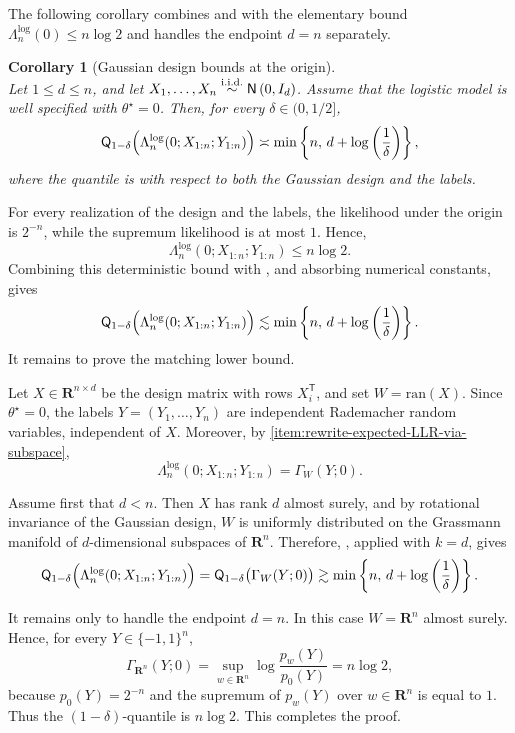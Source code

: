 \documentclass[11pt, letterpaper, hidelinks]{article}
\makeatletter
\renewcommand{\proofname}{\textit{\textbf{Proof}}}
\renewenvironment{proof}[1][\proofname]{\par\pushQED{\qed}\normalfont \topsep6\p@\@plus6\p@\relax\trivlist\item[\hskip\labelsep#1\@addpunct{}]\ignorespaces}{\popQED\endtrivlist\@endpefalse}
\newcommand{\R}{\mathbf R}
\newcommand{\1}{\mathbf 1}
\renewcommand{\le}{\leqslant}
\renewcommand{\leq}{\leqslant}
\newcommand{\T}{\mathsf{T}}
\newcommand{\iid}{\textnormal{i.i.d.}}
\newcommand{\simiid}{\stackrel{\iid}{\sim}}
\theoremstyle{plain}
\newtheorem{corollary}{Corollary}[section]
\theoremstyle{definition}
\newcommand{\thetastar}{\theta^\star}
\newcommand{\Normal}[2]{\mathsf{N}\left(#1, #2\right)}
\newcommand{\Quant}[1]{\mathsf{Q}_{#1}}
\newcommand{\ran}{\mathrm{ran}}
\makeatother
\begin{document}
The following corollary combines  and  with the elementary bound $\Lambda_n^{\operatorname{log}}(0)\leq n\log 2$ and handles the endpoint $d=n$ separately.

\begin{corollary}[Gaussian design bounds at the origin]
\label{cor:gaussian-design-origin}
\leavevmode\\
Let \(1\le d\le n\), and let \(X_1,\ldots,X_n\simiid \Normal{0}{I_d}\). Assume that the logistic model is well specified with \(\thetastar=0\). Then, for every \(\delta\in(0,1/2]\),
\[
\Quant{1-\delta} \Bigl( \Lambda_n^{\operatorname{log}}(0;X_{1:n};Y_{1:n}) \Bigr) \asymp \min\left\{ n,\, d+\log\left(\frac1\delta\right) \right\},
\]
where the quantile is with respect to both the Gaussian design and the labels.
\end{corollary}

\begin{proof}
For every realization of the design and the labels, the likelihood under the
origin is $2^{-n}$, while the supremum likelihood is at most $1$. Hence,
\[
\Lambda_n^{\operatorname{log}}(0;X_{1:n};Y_{1:n})\leq n\log 2.
\]
Combining this deterministic bound with
, and absorbing numerical constants, gives
\[
\Quant{1-\delta}
\Bigl(\Lambda_n^{\operatorname{log}}(0;X_{1:n};Y_{1:n})\Bigr)
\lesssim
\min\left\{n,\,d+\log\left(\frac1\delta\right)\right\}.
\]
It remains to prove the matching lower bound.

Let \(X\in\R^{n\times d}\) be the design matrix with rows \(X_i^\T\), and set
\(W=\ran(X)\). Since \(\thetastar=0\), the labels
\(Y=(Y_1,\ldots,Y_n)\) are independent Rademacher random variables, independent
of \(X\). Moreover, by
\ref{item:rewrite-expected-LLR-via-subspace},
\[
\Lambda_n^{\operatorname{log}}(0;X_{1:n};Y_{1:n})
=
\Gamma_W(Y;0).
\]

Assume first that \(d<n\). Then \(X\) has rank \(d\) almost surely, and by
rotational invariance of the Gaussian design, \(W\) is uniformly distributed on
the Grassmann manifold of \(d\)-dimensional subspaces of \(\R^n\). Therefore,
, applied with
\(k=d\), gives
\[
\Quant{1-\delta}
\Bigl(
\Lambda_n^{\operatorname{log}}(0;X_{1:n};Y_{1:n})
\Bigr)
=
\Quant{1-\delta}\bigl(\Gamma_W(Y;0)\bigr)
\gtrsim
\min\left\{
n,\,
d+\log\left(\frac1\delta\right)
\right\}.
\]

It remains only to handle the endpoint \(d=n\). In this case
\(W=\R^n\) almost surely. Hence, for every \(Y\in\{-1,1\}^n\),
\[
\Gamma_{\R^n}(Y;0)
=
\sup_{w\in\R^n}\log\frac{p_w(Y)}{p_0(Y)}
=
n\log 2,
\]
because \(p_0(Y)=2^{-n}\) and the supremum of \(p_w(Y)\) over \(w\in\R^n\) is
equal to \(1\). Thus the \((1-\delta)\)-quantile is \(n\log 2\). This completes the
proof.
\end{proof}
\end{document}

